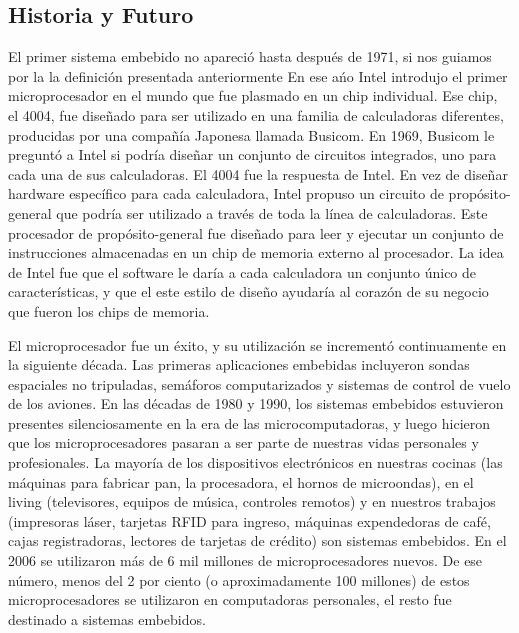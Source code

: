 \documentclass[output=paper, 
colorlinks,
citecolor=brown,
newtxmath
]{langscibook}
\begin{document}
\subsection {Historia y Futuro}

El primer sistema embebido no apareció hasta después de 1971, si nos guiamos por la
la definición presentada anteriormente En ese ańo Intel introdujo el primer microprocesador en el mundo
que fue plasmado en un chip individual. Ese chip, el 4004, fue diseñado para ser utilizado 
en una familia de calculadoras diferentes, producidas por una compañía Japonesa llamada Busicom.
En 1969, Busicom le preguntó a Intel si podría diseñar un conjunto de circuitos integrados,
uno para cada una de sus calculadoras. El 4004 fue la respuesta de Intel. En vez de diseñar
hardware específico para cada calculadora, Intel propuso un circuito de propósito-general
que podría ser utilizado a través de toda la línea de calculadoras. Este procesador de propósito-general
fue diseñado para leer y ejecutar un conjunto de instrucciones almacenadas en un chip de memoria
externo al procesador. La idea de Intel fue que el software le daría a cada calculadora
un conjunto único de características, y que el este estilo de diseño ayudaría al corazón de su 
negocio que fueron los chips de memoria.



El microprocesador fue un éxito, y su utilización se incrementó continuamente en la siguiente
década. Las primeras aplicaciones embebidas incluyeron sondas espaciales no tripuladas, 
semáforos computarizados y sistemas de control de vuelo de los aviones.
En las décadas de 1980 y 1990, los sistemas embebidos estuvieron presentes silenciosamente
en la era de las microcomputadoras, y luego hicieron que los microprocesadores
pasaran a ser parte de nuestras vidas personales y profesionales.
La mayoría de los dispositivos electrónicos en nuestras cocinas (las máquinas para fabricar pan, la procesadora,
el hornos de microondas), en el living (televisores, equipos de música, controles remotos) y 
en nuestros trabajos (impresoras láser, tarjetas RFID para ingreso, máquinas expendedoras de café,
cajas registradoras, lectores de tarjetas de crédito) son sistemas embebidos.
En el 2006 se utilizaron más de 6 mil millones de microprocesadores nuevos. 
De ese número, menos del 2 por ciento (o aproximadamente 100 millones) de estos microprocesadores 
se utilizaron en computadoras personales, el resto fue destinado a sistemas embebidos.
\end{document}
